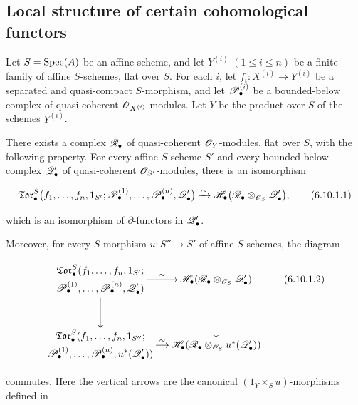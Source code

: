\subsection{Local structure of certain cohomological functors}
\label{subsection:III.6.10}
\label{III.6.10}

\begin{proposition}[6.10.1]
\label{III.6.10.1}
Let $S=\operatorname{Spec}(A)$ be an affine scheme, and let
$Y^{(i)}$ $(1\leq i\leq n)$ be a finite family of affine
$S$-schemes, \textup{flat} over $S$.  For each $i$, let $f_i:X^{(i)}\longrightarrow Y^{(i)}$
be a separated and quasi-compact $S$-morphism, and let
$\mathscr{P}_\bullet^{(i)}$ be a bounded-below complex of
quasi-coherent $\mathscr{O}_{X^{(i)}}$-modules.  Let $Y$ be the product
over $S$ of the schemes $Y^{(i)}$.

There exists a complex $\mathscr{R}_\bullet$ of quasi-coherent
$\mathscr{O}_Y$-modules, \textup{flat} over $S$, with the following property.
For every affine $S$-scheme $S'$ and every bounded-below complex
$\mathscr{Q}_\bullet'$ of quasi-coherent $\mathscr{O}_{S'}$-modules, there is
an isomorphism
\begin{env}[6.10.1.1]
\label{III.6.10.1.1}
\[
  \mathfrak{Tor}_\bullet^S
  \bigl(
    f_1,\ldots,f_n,1_{S'};
    \mathscr{P}_\bullet^{(1)},\ldots,\mathscr{P}_\bullet^{(n)},
    \mathscr{Q}_\bullet'
  \bigr)
  \xrightarrow{\sim}
  \mathscr{H}_\bullet
  \bigl(
    \mathscr{R}_\bullet\otimes_{\mathscr{O}_S}\mathscr{Q}_\bullet'
  \bigr),
  \tag{6.10.1.1}\label{III.6.10.1.1.eq}
\]
\end{env}
which is an isomorphism of $\partial$-functors in
$\mathscr{Q}_\bullet'$.

Moreover, for every $S$-morphism
$u:S''\to S'$ of affine $S$-schemes, the diagram
\begin{env}[6.10.1.2]
\label{III.6.10.1.2}
\[
\xymatrix@C=12pt@R=30pt{
  {\begin{gathered}
    \mathfrak{Tor}_\bullet^S
    (f_1,\ldots,f_n,1_{S'};\\
    \sh P_\bullet^{(1)},\ldots,\sh P_\bullet^{(n)},
    \sh Q_\bullet')
  \end{gathered}}
  \ar[r]^-{\sim}\ar[d]
  &
  {\sh H_\bullet
    (\sh R_\bullet\otimes_{\sh O_S}\sh Q_\bullet')}
  \ar[d]
  \\
  {\begin{gathered}
    \mathfrak{Tor}_\bullet^S
    (f_1,\ldots,f_n,1_{S''};\\
    \sh P_\bullet^{(1)},\ldots,\sh P_\bullet^{(n)},
    u^*(\sh Q_\bullet'))
  \end{gathered}}
  \ar[r]^-{\sim}
  &
  {\sh H_\bullet
    (\sh R_\bullet\otimes_{\sh O_S}u^*(\sh Q_\bullet'))}
}
\tag{6.10.1.2}\label{III.6.10.1.2.eq}
\]
\end{env}
commutes.  Here the vertical arrows are the canonical
$(1_Y\times_Su)$-morphisms defined in .
\end{proposition}

